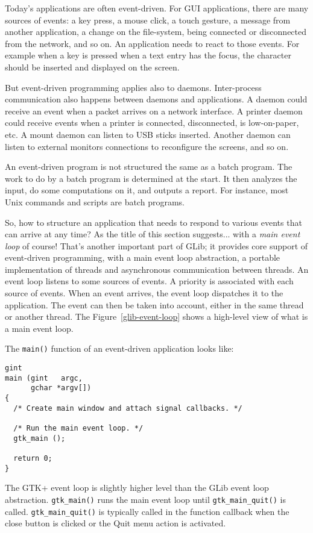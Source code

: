 Today's applications are often event-driven. For GUI applications, there are many sources of events: a key press, a mouse click, a touch gesture, a message from another application, a change on the file-system, being connected or disconnected from the network, and so on. An application needs to react to those events. For example when a key is pressed when a text entry has the focus, the character should be inserted and displayed on the screen.

But event-driven programming applies also to daemons. Inter-process communication also happens between daemons and applications. A daemon could receive an event when a packet arrives on a network interface. A printer daemon could receive events when a printer is connected, disconnected, is low-on-paper, etc. A mount daemon can listen to USB sticks inserted. Another daemon can listen to external monitors connections to reconfigure the screens, and so on.

An event-driven program is not structured the same as a batch program. The work to do by a batch program is determined at the start. It then analyzes the input, do some computations on it, and outputs a report. For instance, most Unix commands and scripts are batch programs.

So, how to structure an application that needs to respond to various events that can arrive at any time? As the title of this section suggests... with a \emph{main event loop} of course! That's another important part of GLib; it provides core support of event-driven programming, with a main event loop abstraction, a portable implementation of threads and asynchronous communication between threads. An event loop listens to some sources of events. A priority is associated with each source of events. When an event arrives, the event loop dispatches it to the application. The event can then be taken into account, either in the same thread or another thread. The Figure~\ref{glib-event-loop} shows a high-level view of what is a main event loop.

The \lstinline{main()} function of an event-driven application looks like:
\begin{lstlisting}
gint
main (gint   argc,
      gchar *argv[])
{
  /* Create main window and attach signal callbacks. */

  /* Run the main event loop. */
  gtk_main ();

  return 0;
}
\end{lstlisting}

The GTK+ event loop is slightly higher level than the GLib event loop abstraction. \lstinline{gtk_main()} runs the main event loop until \lstinline{gtk_main_quit()} is called. \lstinline{gtk_main_quit()} is typically called in the function callback when the close button is clicked or the Quit menu action is activated.

